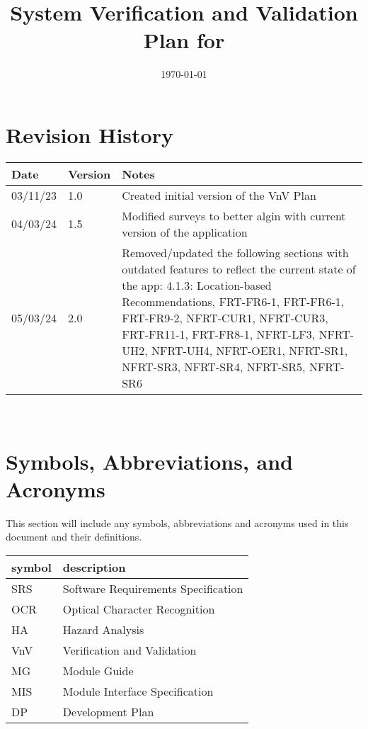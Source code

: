 \documentclass[12pt, titlepage]{article}
\begin{document}
\title{System Verification and Validation Plan for \progname{}} 
\author{\authname}
\date{\today}
	
\maketitle


\section*{Revision History}

\begin{tabularx}{\textwidth}{p{3cm}p{2cm}X}
\toprule {\bf Date} & {\bf Version} & {\bf Notes}\\
\midrule
03/11/23 & 1.0 & Created initial version of the VnV Plan\\
04/03/24 & 1.5 & Modified surveys to better algin with current version of the application\\
05/03/24 & 2.0 & Removed/updated the following sections with outdated features to reflect the current state of the app:
4.1.3: Location-based Recommendations, FRT-FR6-1, FRT-FR6-1, FRT-FR9-2, NFRT-CUR1, NFRT-CUR3, FRT-FR11-1, FRT-FR8-1, NFRT-LF3, NFRT-UH2, NFRT-UH4, NFRT-OER1, NFRT-SR1, NFRT-SR3, NFRT-SR4, NFRT-SR5, NFRT-SR6\\
\bottomrule
\end{tabularx}

~\\

\newpage

\tableofcontents

\listoftables

\newpage

\section{Symbols, Abbreviations, and Acronyms}

This section will include any symbols, abbreviations and acronyms
used in this document and their definitions. \\

\renewcommand{\arraystretch}{1.2}
\begin{tabular}{l l} 
  \toprule		
  \textbf{symbol} & \textbf{description}\\
  \midrule 
  SRS & Software Requirements Specification\\
  OCR & Optical Character Recognition\\
  HA & Hazard Analysis\\
  VnV & Verification and Validation\\
  MG & Module Guide\\
  MIS & Module Interface Specification\\
  DP & Development Plan\\
  \bottomrule
\end{tabular}\\
\end{document}
